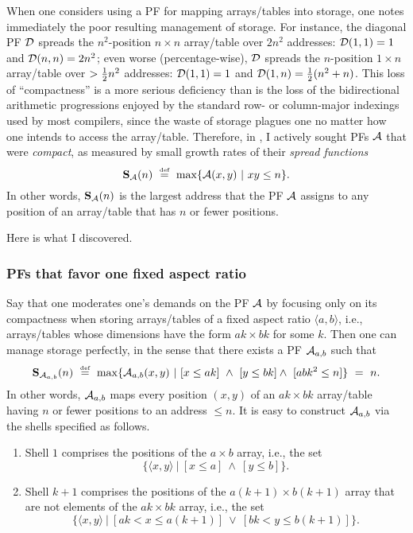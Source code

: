 When one considers using a PF for mapping arrays/tables into storage,
one notes immediately the poor resulting management of storage.  For
instance, the diagonal PF $\mbox{$\cal D$}$ spreads the $n^2$-position $n \times n$
array/table over $2n^2$ addresses: $\mbox{$\cal D$}(1,1) = 1$ and $\mbox{$\cal D$}(n,n) = 2n^2$;
even worse (percentage-wise), $\mbox{$\cal D$}$ spreads the $n$-position $1 \times
n$ array/table over $> {1 \over 2} n^2$ addresses: $\mbox{$\cal D$}(1,1) = 1$ and
$\mbox{$\cal D$}(1,n) = {1 \over 2} (n^2 + n)$.  This loss of ``compactness'' is a
more serious deficiency than is the loss of the bidirectional
arithmetic progressions enjoyed by the standard row- or column-major
indexings used by most compilers, since the waste of storage plagues
one no matter how one intends to access the array/table.  Therefore,
in \cite{Rosenberg74,Rosenberg75}, I actively sought PFs $\mbox{$\cal A$}$ that
were {\it compact}, as measured by small growth rates of their {\it
spread functions}
\begin{equation}
\label{e.compact}
{\bf S}_{\cal A}(n) \ \stackrel{\mbox{{\tiny def}}}{=} \ \max\{ \mbox{$\cal A$}(x, y) \ | \ xy \leq n \}.
\end{equation}
In other words, ${\bf S}_{\cal A}(n)$ is the largest address that the
PF $\mbox{$\cal A$}$ assigns to any position of an array/table that has $n$ or
fewer positions.

Here is what I discovered.

\subsubsection{PFs that favor one fixed aspect ratio}

Say that one moderates one's demands on the PF $\mbox{$\cal A$}$ by focusing only
on its compactness when storing arrays/tables of a fixed aspect ratio
$\langle a, b \rangle$, i.e., arrays/tables whose dimensions have the
form $ak \times bk$ for some $k$.  Then one can manage storage
perfectly, in the sense that there exists a PF $\mbox{$\cal A$}_{a,b}$ such that
\begin{equation}
\label{e.aspect}
{\bf S}_{{\cal A}_{a,b}}(n) \ \stackrel{\mbox{{\tiny def}}}{=} \
\max\{ \mbox{$\cal A$}_{a,b}(x, y) \ | \ [x \leq ak] \ \wedge \ [y \leq bk] \wedge
	\ [abk^2 \leq n] \}
	\ = \ n.
\end{equation}
In other words, $\mbox{$\cal A$}_{a,b}$ maps every position $(x,y)$ of an $ak
\times bk$ array/table having $n$ or fewer positions to an address
$\leq n$.  It is easy to construct $\mbox{$\cal A$}_{a,b}$ via the shells specified
as follows.
\begin{enumerate}
\item
Shell $1$ comprises the positions of the $a \times b$ array, i.e., the
set 
\[ \{ \langle x,y \rangle \ | \ [x \leq a] \ \wedge \ [y \leq b] \}. \]
\item
Shell $k+1$ comprises the positions of the $a(k+1) \times b(k+1)$
array that are not elements of the $ak \times bk$ array, i.e., the
set
\[ \{ \langle x,y \rangle \ | \ [ak < x \leq a(k+1)] \ \vee \ [bk < y
\leq b(k+1)] \}. \]
\end{enumerate}

